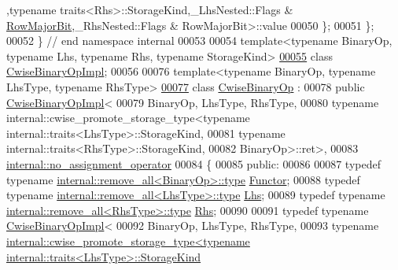 \begin{DoxyCode}
      ,\textcolor{keyword}{typename} traits<Rhs>::StorageKind,\_LhsNested::Flags & \hyperlink{group__flags_gae4f56c2a60bbe4bd2e44c5b19cbe8762}{RowMajorBit},\_RhsNested::Flags & 
      RowMajorBit>::value
00050   \};
00051 \};
00052 \} \textcolor{comment}{// end namespace internal}
00053 
00054 \textcolor{keyword}{template}<\textcolor{keyword}{typename} BinaryOp, \textcolor{keyword}{typename} Lhs, \textcolor{keyword}{typename} Rhs, \textcolor{keyword}{typename} StorageKind>
\hyperlink{class_eigen_1_1_cwise_binary_op_impl}{00055} \textcolor{keyword}{class }\hyperlink{class_eigen_1_1_cwise_binary_op_impl}{CwiseBinaryOpImpl};
00056 
00076 \textcolor{keyword}{template}<\textcolor{keyword}{typename} BinaryOp, \textcolor{keyword}{typename} LhsType, \textcolor{keyword}{typename} RhsType>
\hyperlink{group___core___module}{00077} \textcolor{keyword}{class }\hyperlink{group___core___module_class_eigen_1_1_cwise_binary_op}{CwiseBinaryOp} : 
00078   \textcolor{keyword}{public} \hyperlink{class_eigen_1_1_cwise_binary_op_impl}{CwiseBinaryOpImpl}<
00079           BinaryOp, LhsType, RhsType,
00080           typename internal::cwise\_promote\_storage\_type<typename internal::traits<LhsType>::StorageKind,
00081                                                         typename internal::traits<RhsType>::StorageKind,
00082                                                         BinaryOp>::ret>,
00083   \hyperlink{class_eigen_1_1internal_1_1no__assignment__operator}{internal::no\_assignment\_operator}
00084 \{
00085   \textcolor{keyword}{public}:
00086     
00087     \textcolor{keyword}{typedef} \textcolor{keyword}{typename} \hyperlink{group___sparse_core___module}{internal::remove\_all<BinaryOp>::type} 
      \hyperlink{group___sparse_core___module}{Functor};
00088     \textcolor{keyword}{typedef} \textcolor{keyword}{typename} \hyperlink{group___sparse_core___module}{internal::remove\_all<LhsType>::type} 
      \hyperlink{group___sparse_core___module}{Lhs};
00089     \textcolor{keyword}{typedef} \textcolor{keyword}{typename} \hyperlink{group___sparse_core___module}{internal::remove\_all<RhsType>::type} 
      \hyperlink{group___sparse_core___module}{Rhs};
00090 
00091     \textcolor{keyword}{typedef} \textcolor{keyword}{typename} \hyperlink{class_eigen_1_1_cwise_binary_op_impl}{CwiseBinaryOpImpl}<
00092         BinaryOp, LhsType, RhsType,
00093         \textcolor{keyword}{typename} 
      \hyperlink{struct_eigen_1_1internal_1_1cwise__promote__storage__type}{internal::cwise\_promote\_storage\_type<typename internal::traits<LhsType>::StorageKind}

\end{DoxyCode}
